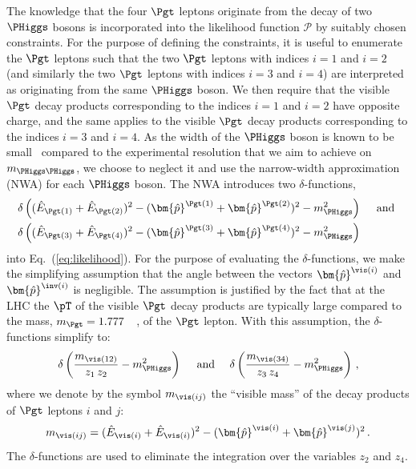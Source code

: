 The knowledge that the four $\Pgt$ leptons originate from the decay of two $\PHiggs$ bosons is incorporated into the likelihood function 
$\mathcal{P}$ by suitably chosen constraints.
For the purpose of defining the constraints, it is useful to enumerate the $\Pgt$ leptons 
such that the two $\Pgt$ leptons with indices $i=1$ and $i=2$ (and similarly the two $\Pgt$ leptons with indices $i=3$ and $i=4$) are interpreted as originating from the same $\PHiggs$ boson.
We then require that the visible $\Pgt$ decay products corresponding to the indices $i=1$ and $i=2$ have opposite charge,
and the same applies to the visible $\Pgt$ decay products corresponding to the indices $i=3$ and $i=4$.
As the width of the $\PHiggs$ boson is known to be small~\cite{HIG-14-002,Aad:2015xua} compared to the experimental resolution that we aim to achieve on $m_{\PHiggs\PHiggs}$,
we choose to neglect it and use the narrow-width approximation (NWA) for each $\PHiggs$ boson.
The NWA introduces two $\delta$-functions, 
\begin{align}
 & \delta\left( (\hat{E}_{\Pgt(1)} + \hat{E}_{\Pgt(2)})^{2} - (\bm{\hat{p}}^{\Pgt(1)} + \bm{\hat{p}}^{\Pgt(2)})^{2} - m_{\PHiggs}^{2} \right) \quad \mbox{ and } \nonumber \\
 & \delta\left( (\hat{E}_{\Pgt(3)} + \hat{E}_{\Pgt(4)})^{2} - (\bm{\hat{p}}^{\Pgt(3)} + \bm{\hat{p}}^{\Pgt(4)})^{2} - m_{\PHiggs}^{2} \right)
\end{align}
into Eq.~(\ref{eq:likelihood}).
For the purpose of evaluating the $\delta$-functions,
we make the simplifying assumption that the angle between the vectors $\bm{\hat{p}}^{\vis(i)}$ and $\bm{\hat{p}}^{\inv(i)}$ is negligible.
The assumption is justified by the fact that at the LHC the $\pT$ of the visible $\Pgt$ decay products are typically large compared to the mass, 
$m_{\Pgt} = 1.777$~\GeV~\cite{PDG}, of the $\Pgt$ lepton.
With this assumption, the $\delta$-functions simplify to:
\begin{equation*}
\delta\left(\frac{m_{\vis(12)}}{z_{1} \, z_{2}} - m_{\PHiggs}^{2}\right) \quad \mbox{ and } \quad \delta\left(\frac{m_{\vis(34)}}{z_{3} \, z_{4}} - m_{\PHiggs}^{2}\right) \, ,
\end{equation*}
where we denote by the symbol $m_{\vis(ij)}$ the ``visible mass'' of the decay products of $\Pgt$ leptons $i$ and $j$:
\begin{equation*}
m_{\vis(ij)} = (\hat{E}_{\vis(i)} + \hat{E}_{\vis(i)})^{2} - (\bm{\hat{p}}^{\vis(i)} + \bm{\hat{p}}^{\vis(j)})^{2} \, .
\end{equation*}
The $\delta$-functions are used to eliminate the integration over the variables $z_{2}$ and $z_{4}$.
